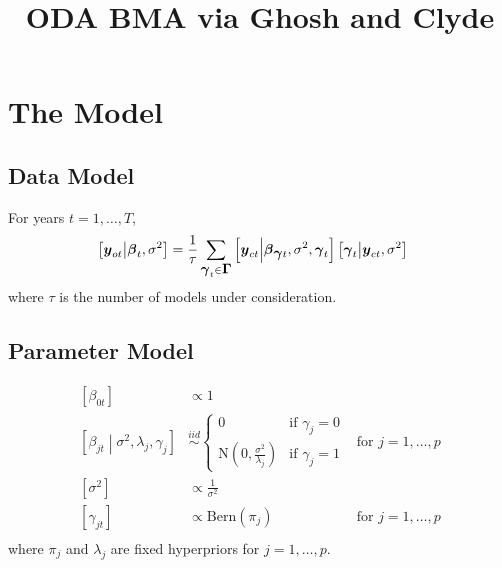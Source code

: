 \documentclass[fleqn]{article}
\title{ODA BMA via Ghosh and Clyde}
\def\bm#1{\mbox{\boldmath $#1$}}
\begin{document}
\section{The Model}
\subsection{Data Model}
%
For years $t = 1, \ldots, T$,
%
\begin{align*}
%
\left[ \bm{y}_{o t} \middle| \bm{\beta}_{t}, \sigma^2 \right] & = \frac{1} {\tau} \sum_{\bm{\gamma}_t \in \bm{\Gamma}} \left[ \bm{y}_{c t} \middle| \bm{\beta}_{\bm{\gamma} t}, \sigma^2, \bm{\gamma}_t \right] \left[ \bm{\gamma}_t \middle| \bm{y}_{c t}, \sigma^2 \right]
%
\end{align*}
where $\tau$ is the number of models under consideration.
\subsection{Parameter Model}
\begin{align*}
%
\left[ \beta_{0 t} \right] & \propto 1\\
%
\left[ \beta_{j t} \middle| \sigma^2, \lambda_j, \gamma_j \right] & \stackrel{iid} {\sim} \begin{cases} 0 & \mbox{if } \gamma_j = 0\\ \mbox{N}\left( 0, \frac{\sigma^2} {\lambda_j} \right) & \mbox{if } \gamma_j = 1 \end{cases} & \mbox{for } j = 1, \ldots , p \\
%
\left[ \sigma^2 \right] & \propto \frac{1} {\sigma^2} \\
%
\left[ \gamma_{j t} \right] & \propto \mbox{Bern} \left( \pi_j \right) & \mbox{for } j = 1, \ldots, p\\
%
\end{align*}
where $\pi_j$ and $\lambda_j$ are fixed hyperpriors for $j = 1, \ldots, p$.%
\end{document}
